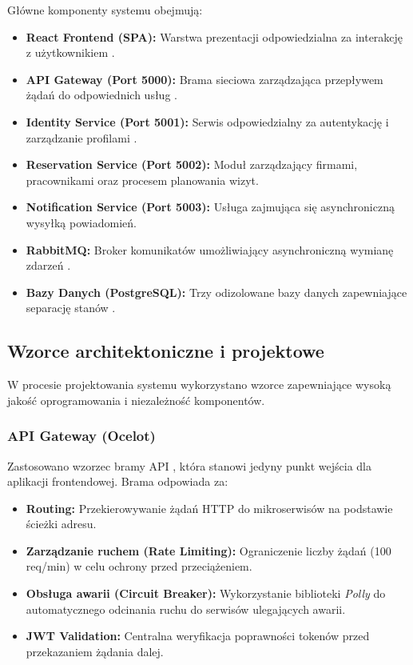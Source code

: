 Główne komponenty systemu obejmują:
\begin{itemize}
    \item \textbf{React Frontend (SPA):} Warstwa prezentacji odpowiedzialna za interakcję z użytkownikiem \cite{react_meta}.
    \item \textbf{API Gateway (Port 5000):} Brama sieciowa zarządzająca przepływem żądań do odpowiednich usług \cite{ocelot_docs}.
    \item \textbf{Identity Service (Port 5001):} Serwis odpowiedzialny za autentykację i zarządzanie profilami \cite{dotnet_microsoft}.
    \item \textbf{Reservation Service (Port 5002):} Moduł zarządzający firmami, pracownikami oraz procesem planowania wizyt.
    \item \textbf{Notification Service (Port 5003):} Usługa zajmująca się asynchroniczną wysyłką powiadomień.
    \item \textbf{RabbitMQ:} Broker komunikatów umożliwiający asynchroniczną wymianę zdarzeń \cite{rabbitmq_docs}.
    \item \textbf{Bazy Danych (PostgreSQL):} Trzy odizolowane bazy danych zapewniające separację stanów \cite{postgresql_docs}.
\end{itemize}

\subsection{Wzorce architektoniczne i projektowe}
W procesie projektowania systemu wykorzystano wzorce zapewniające wysoką jakość oprogramowania i niezależność komponentów.

\subsubsection{API Gateway (Ocelot)}
Zastosowano wzorzec bramy API \cite{ocelot_docs}, która stanowi jedyny punkt wejścia dla aplikacji frontendowej. Brama odpowiada za:
\begin{itemize}
    \item \textbf{Routing:} Przekierowywanie żądań HTTP do mikroserwisów na podstawie ścieżki adresu.
    \item \textbf{Zarządzanie ruchem (Rate Limiting):} Ograniczenie liczby żądań (100 req/min) w celu ochrony przed przeciążeniem.
    \item \textbf{Obsługa awarii (Circuit Breaker):} Wykorzystanie biblioteki \textit{Polly} do automatycznego odcinania ruchu do serwisów ulegających awarii.
    \item \textbf{JWT Validation:} Centralna weryfikacja poprawności tokenów \cite{jwt_rfc} przed przekazaniem żądania dalej.
\end{itemize}


